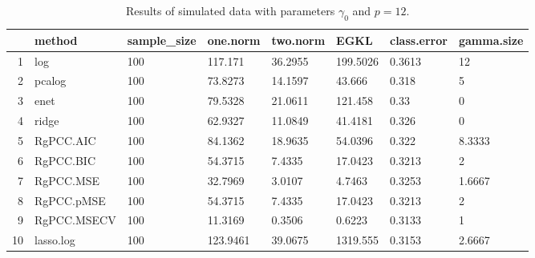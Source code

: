 \begin{table}[ht]
\centering
\begin{tabular}{rlllllll}
  \hline
 & method & sample\_size & one.norm & two.norm & EGKL & class.error & gamma.size \\ 
  \hline
1 & log & 100 & 117.171 & 36.2955 & 199.5026 & 0.3613 & 12 \\ 
  2 & pcalog & 100 & 73.8273 & 14.1597 & 43.666 & 0.318 & 5 \\ 
  3 & enet & 100 & 79.5328 & 21.0611 & 121.458 & 0.33 & 0 \\ 
  4 & ridge & 100 & 62.9327 & 11.0849 & 41.4181 & 0.326 & 0 \\ 
  5 & RgPCC.AIC & 100 & 84.1362 & 18.9635 & 54.0396 & 0.322 & 8.3333 \\ 
  6 & RgPCC.BIC & 100 & 54.3715 & 7.4335 & 17.0423 & 0.3213 & 2 \\ 
  7 & RgPCC.MSE & 100 & 32.7969 & 3.0107 & 4.7463 & 0.3253 & 1.6667 \\ 
  8 & RgPCC.pMSE & 100 & 54.3715 & 7.4335 & 17.0423 & 0.3213 & 2 \\ 
  9 & RgPCC.MSECV & 100 & 11.3169 & 0.3506 & 0.6223 & 0.3133 & 1 \\ 
  10 & lasso.log & 100 & 123.9461 & 39.0675 & 1319.555 & 0.3153 & 2.6667 \\ 
   \hline
\end{tabular}
\caption{Results of simulated data with parameters $\gamma_0$ and $p =12$. } 
\label{fig-0-debug-new-algo-12-metrics-p}
\end{table}
